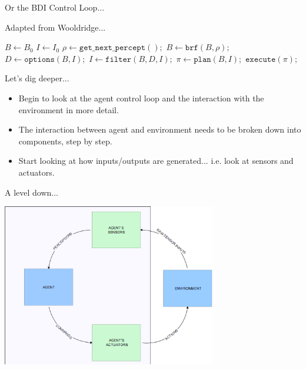 \documentclass[xcolor=dvipsnames,t]{beamer}
\begin{document}
\begin{frame}{Or the BDI Control Loop...}
    \begin{block}{Adapted from Wooldridge...} 
        \begin{algorithmic}[0] 
                \State $B \gets B_0$
                \State $I \gets I_0$
                    \State $\rho \gets \texttt{get\_next\_percept}();$
                    \State $B \gets \texttt{brf}(B, \rho);$
                    \State $D \gets \texttt{options}(B, I);$ 
                    \State $I \gets \texttt{filter}(B, D, I); $
                    \State $\pi \gets \texttt{plan}(B, I); $
                    \State $\texttt{execute}(\pi); $
                \EndWhile
            \EndProcedure
        \end{algorithmic} 
    \end{block} 
\end{frame} 

\begin{frame}{Let's dig deeper...}
    \begin{itemize}
        \item Begin to look at the agent control loop and the interaction
              with the environment in more detail.
        \item The interaction between agent and environment needs to be
              broken down into components, step by step.
        \item Start looking at how inputs/outputs are generated...
              i.e. look at sensors and actuators.
    \end{itemize} 
\end{frame} 

\begin{frame}{A level down...}
    \begin{center}
        \includegraphics[width=0.7\textwidth]{sensorsactuators} 
    \end{center} 
\end{frame} 
\end{document}
